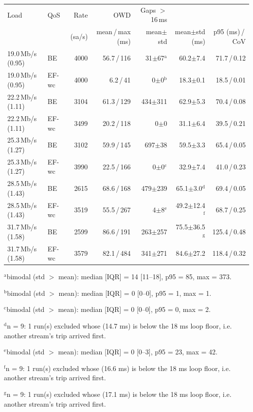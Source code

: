 \begin{tabular}{llrrrrr}
\toprule
Load & QoS & Rate & OWD & Gaps $>$16\,ms & \ttrip{} & \ttrip{} \\
 & & (sa/s) & mean\,/\,max (ms) & mean$\pm$std & mean$\pm$std (ms) & p95 (ms)\,/\,CoV \\
\midrule
19.0\,Mb/s (0.95) & BE & 4000 & 56.7\,/\,116 & 31$\pm$67$^{\mathrm{a}}$ & 60.2$\pm$7.4 & 71.7\,/\,0.12 \\
19.0\,Mb/s (0.95) & EF-wc & 4000 & 6.2\,/\,41 & 0$\pm$0$^{\mathrm{b}}$ & 18.3$\pm$0.1 & 18.5\,/\,0.01 \\
22.2\,Mb/s (1.11) & BE & 3104 & 61.3\,/\,129 & 434$\pm$311 & 62.9$\pm$5.3 & 70.4\,/\,0.08 \\
22.2\,Mb/s (1.11) & EF-wc & 3499 & 20.2\,/\,118 & 0$\pm$0 & 31.1$\pm$6.4 & 39.5\,/\,0.21 \\
25.3\,Mb/s (1.27) & BE & 3102 & 59.9\,/\,145 & 697$\pm$38 & 59.5$\pm$3.3 & 65.4\,/\,0.05 \\
25.3\,Mb/s (1.27) & EF-wc & 3990 & 22.5\,/\,166 & 0$\pm$0$^{\mathrm{c}}$ & 32.9$\pm$7.4 & 41.0\,/\,0.23 \\
28.5\,Mb/s (1.43) & BE & 2615 & 68.6\,/\,168 & 479$\pm$239 & 65.1$\pm$3.0$^{\mathrm{d}}$ & 69.4\,/\,0.05 \\
28.5\,Mb/s (1.43) & EF-wc & 3519 & 55.5\,/\,267 & 4$\pm$8$^{\mathrm{e}}$ & 49.2$\pm$12.4$^{\mathrm{f}}$ & 68.7\,/\,0.25 \\
31.7\,Mb/s (1.58) & BE & 2599 & 86.6\,/\,191 & 263$\pm$257 & 75.5$\pm$36.5$^{\mathrm{g}}$ & 125.4\,/\,0.48 \\
31.7\,Mb/s (1.58) & EF-wc & 3579 & 82.1\,/\,484 & 341$\pm$271 & 84.6$\pm$27.2 & 118.4\,/\,0.32 \\
\bottomrule
\end{tabular}
\par\smallskip\footnotesize $^{\mathrm{a}}$bimodal (std $>$ mean): median [IQR] = 14 [11--18], p95 = 85, max = 373.
\par\smallskip\footnotesize $^{\mathrm{b}}$bimodal (std $>$ mean): median [IQR] = 0 [0--0], p95 = 1, max = 1.
\par\smallskip\footnotesize $^{\mathrm{c}}$bimodal (std $>$ mean): median [IQR] = 0 [0--0], p95 = 0, max = 2.
\par\smallskip\footnotesize $^{\mathrm{d}}$n = 9: 1 run(s) excluded whose \ttrip{} (14.7 ms) is below the 18 ms loop floor, i.e. another stream's trip arrived first.
\par\smallskip\footnotesize $^{\mathrm{e}}$bimodal (std $>$ mean): median [IQR] = 0 [0--3], p95 = 23, max = 42.
\par\smallskip\footnotesize $^{\mathrm{f}}$n = 9: 1 run(s) excluded whose \ttrip{} (16.6 ms) is below the 18 ms loop floor, i.e. another stream's trip arrived first.
\par\smallskip\footnotesize $^{\mathrm{g}}$n = 9: 1 run(s) excluded whose \ttrip{} (17.1 ms) is below the 18 ms loop floor, i.e. another stream's trip arrived first.
